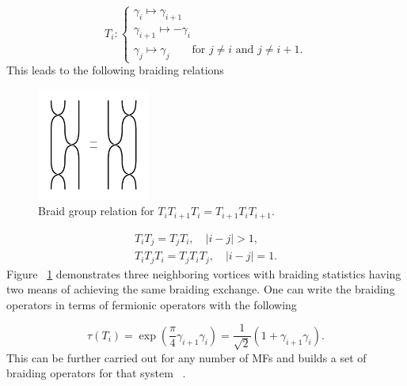 \begin{equation}
  T_i :
  \begin{cases}
    \gamma_i \mapsto \gamma_{i+1} \\
    \gamma_{i+1} \mapsto -\gamma_i \\
    \gamma_j \mapsto \gamma_j \quad\quad \text{for $j\neq i$ and $j\neq i+1$}.
  \end{cases}
\end{equation}
This leads to the following braiding relations

\begin{figure}
  \includegraphics[width=0.33\textwidth]{./figures/braid.pdf}
  \caption{Braid group relation for $T_i T_{i+1} T_i = T_{i+1} T_i T_{i+1}$.}
  \label{fig:braid}
\end{figure}
\begin{equation}
  \begin{align*}
    T_i T_j = T_j T_i, \quad |i-j| > 1, \\
    T_i T_j T_i = T_j T_i T_j, \quad |i-j| = 1.
  \end{align*}
\end{equation}
Figure ~\ref{fig:braid} demonstrates three neighboring vortices with braiding statistics having two means of achieving the same braiding exchange.
One can write the braiding operators in terms of fermionic operators with the following

\begin{equation}
  \tau(T_i) = \exp\left(\dfrac{\pi}{4} \gamma_{i+1} \gamma_i\right) = \dfrac{1}{\sqrt{2}} \left(1+ \gamma_{i+1} \gamma_i\right).
\end{equation}
This can be further carried out for any number of MFs and builds a set of braiding operators for that system ~\cite{ivanovNonAbelianStatisticsHalfQuantum2001}.

